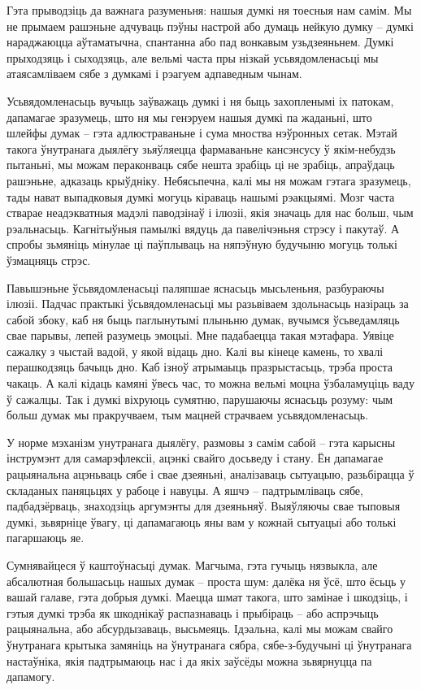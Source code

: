 Гэта прыводзіць да важнага разуменьня: нашыя думкі ня тоесныя нам самім. Мы не прымаем рашэньне адчуваць пэўны настрой або думаць нейкую думку – думкі нараджаюцца аўтаматычна, спантанна або пад вонкавым узьдзеяньнем. Думкі прыходзяць і сыходзяць, але вельмі часта пры нізкай усьвядомленасьці мы атаясамліваем сябе з думкамі і рэагуем адпаведным чынам.

Усьвядомленасьць вучыць заўважаць думкі і ня быць захопленымі іх патокам, дапамагае зразумець, што ня мы генэруем нашыя думкі па жаданьні, што шлейфы думак – гэта адлюстраваньне і сума мноства нэўронных сетак. Мэтай такога ўнутранага дыялёгу зьяўляецца фармаваньне кансэнсусу ў якім-небудзь пытаньні, мы можам пераконваць сябе нешта зрабіць ці не зрабіць, апраўдаць рашэньне, адказаць крыўдніку. Небясьпечна, калі мы ня можам гэтага зразумець, тады нават выпадковыя думкі могуць кіраваць нашымі рэакцыямі. Мозг часта стварае неадэкватныя мадэлі паводзінаў і ілюзіі, якія значаць для нас больш, чым рэальнасьць. Кагнітыўныя памылкі вядуць да павелічэньня стрэсу і пакутаў. А спробы зьмяніць мінулае ці паўплываць на няпэўную будучыню могуць толькі ўзмацняць стрэс.

Павышэньне ўсьвядомленасьці паляпшае яснасьць мысьленьня, разбураючы ілюзіі. Падчас практыкі ўсьвядомленасьці мы разьвіваем здольнасьць назіраць за сабой збоку, каб ня быць паглынутымі плыньню думак, вучымся ўсьведамляць свае парывы, лепей разумець эмоцыі. Мне падабаецца такая мэтафара. Уявіце сажалку з чыстай вадой, у якой відаць дно. Калі вы кінеце камень, то хвалі перашкодзяць бачыць дно. Каб ізноў атрымаыць празрыстасьць, трэба проста чакаць. А калі кідаць камяні ўвесь час, то можна вельмі моцна ўзбаламуціць ваду ў сажалцы. Так і думкі віхруюць сумятню, парушаючы яснасьць розуму: чым больш думак мы пракручваем, тым мацней страчваем усьвядомленасьць.

У норме мэханізм унутранага дыялёгу, размовы з самім сабой – гэта карысны інструмэнт для самарэфлексіі, ацэнкі свайго досьведу і стану. Ён дапамагае рацыянальна ацэньваць сябе і свае дзеяньні, аналізаваць сытуацыю, разьбірацца ў складаных паняцьцях у рабоце і навуцы. А яшчэ – падтрымліваць сябе, падбадзёрваць, знаходзіць аргумэнты для дзеяньняў. Выяўляючы свае тыповыя думкі, зьвярніце ўвагу, ці дапамагаюць яны вам у кожнай сытуацыі або толькі пагаршаюць яе.

Сумнявайцеся ў каштоўнасьці думак. Магчыма, гэта гучыць нязвыкла, але абсалютная большасьць нашых думак – проста шум: далёка ня ўсё, што ёсьць у вашай галаве, гэта добрыя думкі. Маецца шмат такога, што замінае і шкодзіць, і гэтыя думкі трэба як шкоднікаў распазнаваць і прыбіраць – або аспрэчыць рацыянальна, або абсурдызаваць, высьмеяць. Ідэальна, калі мы можам свайго ўнутранага крытыка замяніць на ўнутранага сябра, сябе-з-будучыні ці ўнутранага настаўніка, якія падтрымаюць нас і да якіх заўсёды можна зьвярнуцца па дапамогу.

